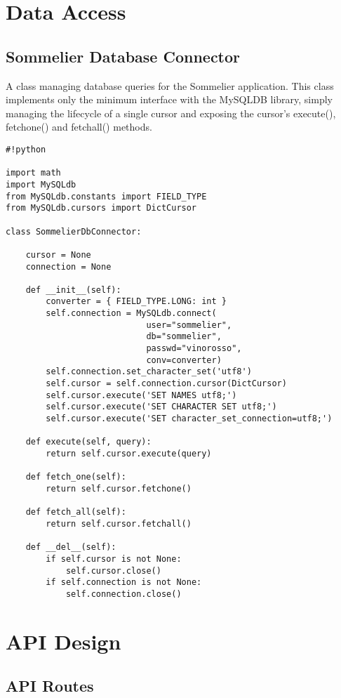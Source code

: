 \section{Data Access}

\subsection{Sommelier Database Connector}

A class managing database queries for the Sommelier application. This class implements only the minimum interface with the MySQLDB library, simply managing the lifecycle of a single cursor and exposing the cursor's execute(), fetchone() and fetchall() methods.

\begin{verbatim}
#!python

import math
import MySQLdb
from MySQLdb.constants import FIELD_TYPE
from MySQLdb.cursors import DictCursor

class SommelierDbConnector:
    
    cursor = None
    connection = None

    def __init__(self):
        converter = { FIELD_TYPE.LONG: int }
        self.connection = MySQLdb.connect(
                            user="sommelier",
                            db="sommelier",
                            passwd="vinorosso",
                            conv=converter)
        self.connection.set_character_set('utf8')
        self.cursor = self.connection.cursor(DictCursor)
        self.cursor.execute('SET NAMES utf8;')
        self.cursor.execute('SET CHARACTER SET utf8;')
        self.cursor.execute('SET character_set_connection=utf8;')

    def execute(self, query):
        return self.cursor.execute(query)

    def fetch_one(self):
        return self.cursor.fetchone()

    def fetch_all(self):
        return self.cursor.fetchall()

    def __del__(self):
        if self.cursor is not None:
            self.cursor.close()
        if self.connection is not None:
            self.connection.close()
\end{verbatim}

\section{API Design}

\subsection{API Routes}

